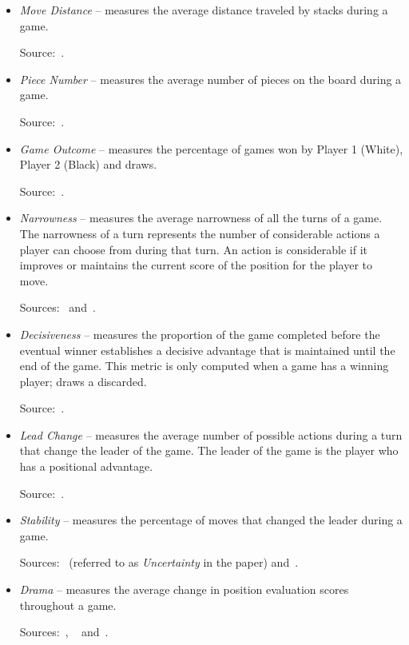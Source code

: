 \begin{itemize}
    \item \textit{Move Distance} -- measures the average distance traveled by stacks during a game.
    
    Source:~\cite{ludii_concepts}.
    
    \item \textit{Piece Number} -- measures the average number of pieces on the board during a game.
    
    Source:~\cite{ludii_concepts}.
    
    \item \textit{Game Outcome} -- measures the percentage of games won by Player 1 (White), Player 2 (Black) and draws.
    
    Source:~\cite{browne2010evolutionary}.
    
    \item \textit{Narrowness} -- measures the average narrowness of all the turns of a game. The narrowness of a turn represents the number of considerable actions a player can choose from during that turn. An action is considerable if it improves or maintains the current score of the position for the player to move.
    
    Sources:~\cite{browne2008recombination} and~\cite{ludii_concepts}.
    
    \item \textit{Decisiveness} -- measures the proportion of the game completed before the eventual winner establishes a decisive advantage that is maintained until the end of the game. This metric is only computed when a game has a winning player; draws a discarded.
    
    Source:~\cite{browne2008recombination}.
    
    \item \textit{Lead Change} -- measures the average number of possible actions during a turn that change the leader of the game. The leader of the game is the player who has a positional advantage.
    
    Source:~\cite{ludii_concepts}.
    
    \item \textit{Stability} -- measures the percentage of moves that changed the leader during a game.
    
    Sources:~\cite{browne2010evolutionary} (referred to as \textit{Uncertainty} in the paper) and~\cite{ludii_concepts}.
    
    \item \textit{Drama} -- measures the average change in position evaluation scores throughout a game.
    
    Sources:~\cite{browne2010evolutionary}, ~\cite{browne2008recombination} and~\cite{ludii_concepts}.
\end{itemize}

